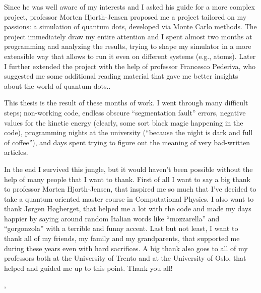 Since he was well aware of my interests and I asked his guide for a more complex project, professor Morten Hjorth-Jensen proposed me a project tailored on my passions: a simulation of quantum dots, developed via Monte Carlo methods. The project immediately draw my entire attention and I spent almost two months at programming and analyzing the results, trying to shape my simulator in a more extensible way that allows to run it even on different systems (e.g., atoms). Later I further extended the project with the help of professor Francesco Pederiva, who suggested me some additional reading material that gave me better insights about the world of quantum dots..

This thesis is the result of these months of work. I went through many difficult steps; non-working code, endless obscure ``segmentation fault'' errors, negative values for the kinetic energy (clearly, some sort black magic happening in the code), programming nights at the university (``because the night is dark and full of coffee''), and days spent trying to figure out the meaning of very bad-written articles.

In the end I survived this jungle, but it would haven't been possible without the help of many people that I want to thank. First of all I want to say a big thank to professor Morten Hjorth-Jensen, that inspired me so much that I've decided to take a quantum-oriented master course in Computational Physics. I also want to thank Jørgen Høgberget, that helped me a lot with the code and made my days happier by saying around random Italian words like ``mozzarella'' and ``gorgonzola'' with a terrible and funny accent. Last but not least, I want to thank all of my friends, my family and my grandparents, that supported me during these years even with hard sacrifices. A big thank also goes to all of my professors both at the University of Trento and at the University of Oslo, that helped and guided me up to this point. Thank you all!

\begin{flushright}
	{ \THauthor }
\end{flushright}
\begin{flushleft}
	{ \THplace, \THdate }
\end{flushleft}


